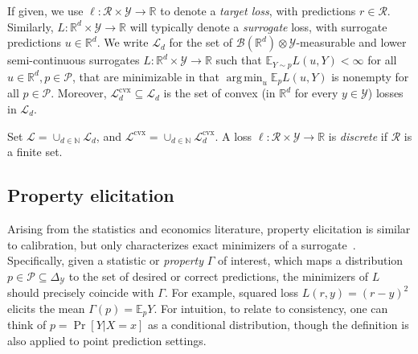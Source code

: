 \documentclass[11pt]{article} %
\newcommand{\Comments}{1}
\newcommand{\mytodo}[2]{\ifnum\Comments=1%
	\todo[linecolor=#1!80!black,backgroundcolor=#1,bordercolor=#1!80!black]{#2}\fi}
\newcommand{\raft}[1]{\mytodo{green!20!white}{RF: #1}}
\newcommand{\jessiet}[1]{\mytodo{purple!20!white}{JF: #1}}
\newcommand{\btw}[1]{}%
\newcommand{\reals}{\mathbb{R}}
\newcommand{\simplex}{\Delta_\Y}
\newcommand{\A}{\mathcal{A}}
\newcommand{\E}{\mathbb{E}}
\renewcommand{\L}{\mathcal{L}}
\newcommand{\Lcvx}{\mathcal{L}^{\mathrm{cvx}}}
\newcommand{\R}{\mathcal{R}}
\renewcommand{\P}{\mathcal{P}}
\newcommand{\Y}{\mathcal{Y}}
\newcommand{\exploss}[3]{\E_{#3} #1(#2,Y)}
\DeclareMathOperator*{\argmin}{arg\,min}
\begin{document}
If given, we use $\ell: \R \times \Y \to \reals$ to denote a \emph{target loss}, with predictions $r\in\R$.
Similarly, $L: \reals^d \times \Y \to \reals$ will typically denote a \emph{surrogate} loss, with surrogate predictions $u \in \reals^d$.
We write $\L_d $ for the set of $\mathcal{B}(\reals^d) \otimes \Y$-measurable and lower semi-continuous surrogates $L : \reals^d \times\Y \to \reals$ such that $\E_{Y \sim p} L(u,Y) < \infty$ for all $u \in \reals^d, p \in \P$, that are minimizable in that $\argmin_{u} \exploss{L}{u}{p}$ is nonempty for all $p\in\P$.
Moreover, $\Lcvx_d \subseteq \L_d$ is the set of convex (in $\reals^d$ for every $y \in \Y$) losses in $\L_d$.
\btw{Sufficient condition for $\A$-normal convex integrand: $L$ is lower semi-continuous and $\mathcal{B}(\A) \otimes \Y$-measurable; $\E_p L(u,Y)$ finite for all $u, p$, there exists a $u_0$ for each $p$ so that $\E_p L(u_0, Y)$ is finite and continuous for Rockefellar's corollary, though it's stricter than Ioffe and Tokhimorov IIRC}
Set $\L = \cup_{d \in \mathbb{N}} \L_d$, and $\Lcvx = \cup_{d \in \mathbb{N}} \Lcvx_d$.
A loss $\ell: \R\times \Y \to \reals$ is \emph{discrete} if $\R$ is a finite set.








\subsection{Property elicitation}\label{subsec:properties}
Arising from the statistics and economics literature, property elicitation is similar to calibration, but only characterizes exact minimizers of a surrogate~\citep{savage1971elicitation,osband1985information-eliciting,lambert2008eliciting,lambert2009eliciting,lambert2018elicitation,frongillo2015vector-valued,frongillo2014general}.
Specifically, given a statistic or \emph{property} $\Gamma$ of interest, which maps a distribution $p \in \P \subseteq \simplex$ to the set of desired or correct predictions, the minimizers of $L$ should precisely coincide with $\Gamma$.
For example, squared loss $L(r,y) = (r-y)^2$ elicits the mean $\Gamma(p) = \E_p Y$.
For intuition, to relate to consistency, one can think of $p = \Pr[Y|X=x]$ as a conditional distribution, though the definition is also applied to point prediction settings.
\end{document}
